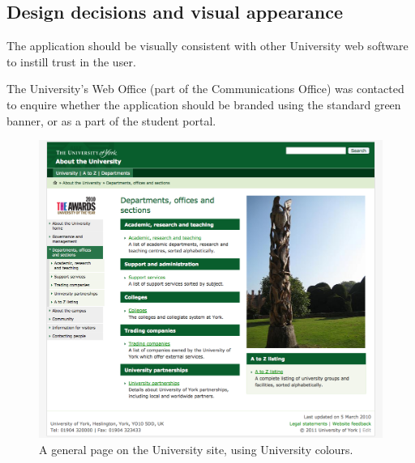 \documentclass[draft]{scrartcl}
\begin{document}


\subsection{Design decisions and visual appearance}

The application should be visually consistent with other University web
software to instill trust in the user.

The University's Web Office (part of the Communications Office) was contacted
to enquire whether the application should be branded using the standard green
banner, or as a part of the student portal.



\begin{figure}
  \begin{center}
    \includegraphics[width=160mm]{images/2011_11_06_yorkacuk.png}
  \end{center}
  \caption{A general page on the University site, using University colours.}
  \label{yorkacuk_general_page}
\end{figure}
\end{document}

